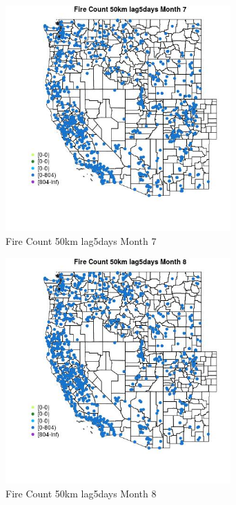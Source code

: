 \begin{figure} 
\centering  
\includegraphics[width=0.77\textwidth]{Code_Outputs/Report_ML_input_PM25_Step4_part_f_de_duplicated_aves_prioritize_24hr_obswNAs_MapObsMo7Fire_Count_50km_lag5days.jpg} 
\caption{\label{fig:Report_ML_input_PM25_Step4_part_f_de_duplicated_aves_prioritize_24hr_obswNAsMapObsMo7Fire_Count_50km_lag5days}Fire Count 50km lag5days Month 7} 
\end{figure} 
 

\begin{figure} 
\centering  
\includegraphics[width=0.77\textwidth]{Code_Outputs/Report_ML_input_PM25_Step4_part_f_de_duplicated_aves_prioritize_24hr_obswNAs_MapObsMo8Fire_Count_50km_lag5days.jpg} 
\caption{\label{fig:Report_ML_input_PM25_Step4_part_f_de_duplicated_aves_prioritize_24hr_obswNAsMapObsMo8Fire_Count_50km_lag5days}Fire Count 50km lag5days Month 8} 
\end{figure} 
 

